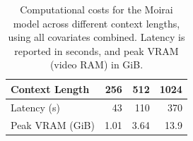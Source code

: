 \begin{table}[htbp]
    \centering
    \footnotesize
    \begin{tabular}{lrrr}
    \toprule
    \textbf{Context Length} & \textbf{256} & \textbf{512} & \textbf{1024} \\
    \midrule
    Latency (s)    & 43  & 110 & 370  \\
    Peak VRAM (GiB)& 1.01& 3.64& 13.9 \\
    \bottomrule
    \end{tabular}
    \caption{Computational costs for the Moirai model across different context lengths, using all covariates combined. Latency is reported in seconds, and peak VRAM (video RAM) in GiB.}
    \label{tab:multivar_cost}
    \end{table}